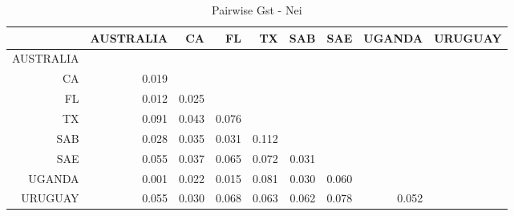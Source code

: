 \documentclass[a4paper]{scrartcl}\usepackage[]{graphicx}\usepackage[]{color}
\begin{document}
\begin{table}[ht]
\centering
\begin{tabular}{rrrrrrrrr}
  \hline
 & AUSTRALIA & CA & FL & TX & SAB & SAE & UGANDA & URUGUAY \\ 
  \hline
AUSTRALIA &  &  &  &  &  &  &  &  \\ 
  CA & 0.019 &  &  &  &  &  &  &  \\ 
  FL & 0.012 & 0.025 &  &  &  &  &  &  \\ 
  TX & 0.091 & 0.043 & 0.076 &  &  &  &  &  \\ 
  SAB & 0.028 & 0.035 & 0.031 & 0.112 &  &  &  &  \\ 
  SAE & 0.055 & 0.037 & 0.065 & 0.072 & 0.031 &  &  &  \\ 
  UGANDA & 0.001 & 0.022 & 0.015 & 0.081 & 0.030 & 0.060 &  &  \\ 
  URUGUAY & 0.055 & 0.030 & 0.068 & 0.063 & 0.062 & 0.078 & 0.052 &  \\ 
   \hline
\end{tabular}
\caption{Pairwise Gst - Nei} 
\end{table}





\FloatBarrier
\end{document}
